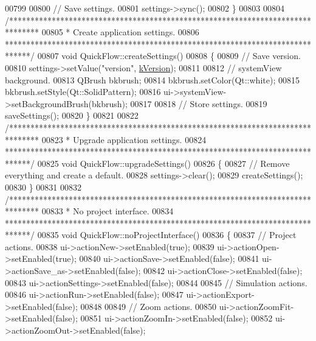 \begin{DoxyCode}
00799 
00800   \textcolor{comment}{// Save settings.}
00801   settings->sync();
00802 \}
00803 
00804 \textcolor{comment}{/*******************************************************************************}
00805 \textcolor{comment}{ * Create application settings.}
00806 \textcolor{comment}{ ******************************************************************************/}
00807 \textcolor{keywordtype}{void} QuickFlow::createSettings()
00808 \{
00809   \textcolor{comment}{// Save version.}
00810   settings->setValue(\textcolor{stringliteral}{"version"}, \hyperlink{group___window_gabfc3b1280bdae9a9c046d56b1459ab99}{kVersion});
00811 
00812 \textcolor{comment}{//  systemView background.}
00813   QBrush bkbrush;
00814   bkbrush.setColor(Qt::white);
00815   bkbrush.setStyle(Qt::SolidPattern);
00816   ui->systemView->setBackgroundBrush(bkbrush);
00817 
00818   \textcolor{comment}{// Store settings.}
00819   saveSettings();
00820 \}
00821 
00822 \textcolor{comment}{/*******************************************************************************}
00823 \textcolor{comment}{ * Upgrade application settings.}
00824 \textcolor{comment}{ ******************************************************************************/}
00825 \textcolor{keywordtype}{void} QuickFlow::upgradeSettings()
00826 \{
00827   \textcolor{comment}{// Remove everything and create a default.}
00828   settings->clear();
00829   createSettings();
00830 \}
00831 
00832 \textcolor{comment}{/*******************************************************************************}
00833 \textcolor{comment}{ * No project interface.}
00834 \textcolor{comment}{ ******************************************************************************/}
00835 \textcolor{keywordtype}{void} QuickFlow::noProjectInterface()
00836 \{
00837   \textcolor{comment}{// Project actions.}
00838   ui->actionNew->setEnabled(\textcolor{keyword}{true});
00839   ui->actionOpen->setEnabled(\textcolor{keyword}{true});
00840   ui->actionSave->setEnabled(\textcolor{keyword}{false});
00841   ui->actionSave\_as->setEnabled(\textcolor{keyword}{false});
00842   ui->actionClose->setEnabled(\textcolor{keyword}{false});
00843   ui->actionSettings->setEnabled(\textcolor{keyword}{false});
00844 
00845   \textcolor{comment}{// Simulation actions.}
00846   ui->actionRun->setEnabled(\textcolor{keyword}{false});
00847   ui->actionExport->setEnabled(\textcolor{keyword}{false});
00848 
00849   \textcolor{comment}{// Zoom actions.}
00850   ui->actionZoomFit->setEnabled(\textcolor{keyword}{false});
00851   ui->actionZoomIn->setEnabled(\textcolor{keyword}{false});
00852   ui->actionZoomOut->setEnabled(\textcolor{keyword}{false});

\end{DoxyCode}
